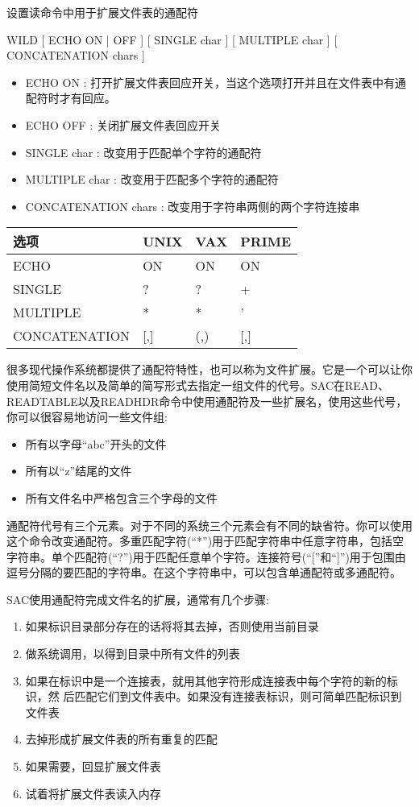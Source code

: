 \label{cmd:wild}

设置读命令中用于扩展文件表的通配符

WILD [ ECHO ON | OFF ] [ SINGLE char ] [ MULTIPLE char ] [ CONCATENATION chars ]

\begin{itemize}
\item ECHO ON : 打开扩展文件表回应开关，当这个选项打开并且在文件表中有通配符时才有回应。 
\item ECHO OFF : 关闭扩展文件表回应开关 
\item SINGLE char : 改变用于匹配单个字符的通配符 
\item MULTIPLE char : 改变用于匹配多个字符的通配符 
\item CONCATENATION chars : 改变用于字符串两侧的两个字符连接串 
\end{itemize}

\begin{center}
\begin{tabular}{llll}
\toprule
选项	&	UNIX	&	VAX		&	PRIME	\\
\midrule
ECHO	&	ON 		&	ON 		&	ON		\\
SINGLE  &	?  		&	?  		&	+		\\
MULTIPLE&	* 		&	* 		&	'		\\
CONCATENATION& [,] & 	(,)  	&	[,]		\\
\bottomrule
\end{tabular}
\end{center}

很多现代操作系统都提供了通配符特性，也可以称为文件扩展。它是一个可以让你使用简短文件名以及简单的简写形式去指定一组文件的代号。SAC在READ、READTABLE以及READHDR命令中使用通配符及一些扩展名，使用这些代号，你可以很容易地访问一些文件组:
\begin{itemize}
\item 所有以字母``abc''开头的文件
\item 所有以``z''结尾的文件
\item 所有文件名中严格包含三个字母的文件
\end{itemize}

通配符代号有三个元素。对于不同的系统三个元素会有不同的缺省符。你可以使用这个命令改变通配符。多重匹配字符(``*'')用于匹配字符串中任意字符串，包括空字符串。单个匹配符(``?'')用于匹配任意单个字符。连接符号(``[''和``]'')用于包围由逗号分隔的要匹配的字符串。在这个字符串中，可以包含单通配符或多通配符。

SAC使用通配符完成文件名的扩展，通常有几个步骤:
\begin{enumerate}
\item 如果标识目录部分存在的话将将其去掉，否则使用当前目录
\item 做系统调用，以得到目录中所有文件的列表
\item 如果在标识中是一个连接表，就用其他字符形成连接表中每个字符的新的标识，然	  后匹配它们到文件表中。如果没有连接表标识，则可简单匹配标识到文件表
\item 去掉形成扩展文件表的所有重复的匹配
\item 如果需要，回显扩展文件表
\item 试着将扩展文件表读入内存
\end{enumerate}

